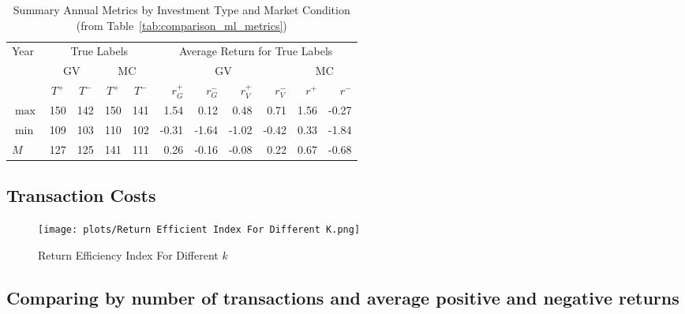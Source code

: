 \documentclass{article}
\begin{document}
\begin{table}[!ht]
    \centering
    \caption{Summary Annual Metrics by Investment Type and 
    Market Condition (from Table~\ref{tab:comparison_ml_metrics})}
    \begin{tabular}{l| cc | cc || rrrr|rr}
    \hline
    \multirow{3}{*}{Year} & \multicolumn{4}{c||}{True Labels}   & \multicolumn{6}{c}{Average Return for True Labels}  \\ \cline{2-11}
     & \multicolumn{2}{c|}{GV}  &  \multicolumn{2}{c||}{MC}  & \multicolumn{4}{c|}{GV}  &  \multicolumn{2}{c}{MC}  \\ \cline{2-11}
    & $T^{+}$ & $T^{-}$ & $T^{+}$ & $T^{-}$ & $r^{+}_{G}$ & $r^{-}_{G}$ & $r^{+}_{V}$ & $r^{-}_{V}$ & $r^{+}$ & $r^{-}$ \\ \cline{1-11}
         $\max$ & 150 & 142 & 150 & 141 & 1.54 & 0.12 & 0.48 & 0.71 & 1.56 & -0.27 \\ 
        $\min$ & 109 & 103 & 110 & 102 & -0.31 & -1.64 & -1.02 & -0.42 & 0.33 & -1.84 \\ 
        $M$ & 127 & 125 & 141 & 111 & 0.26 & -0.16 & -0.08 & 0.22 & 0.67 & -0.68 \\ 
        \hline
    \end{tabular}
    \label{tab:comparison_ml_metrics_summary}
\end{table}

\subsection{Transaction Costs}



\begin{figure}[htbp]
  \centering
  \texttt{[image: plots/Return Efficient Index For Different K.png]}
  \caption{Return Efficiency Index For Different $k$}
  \label{fig:Return Efficient Index For Different K}
\end{figure}

\subsection{Comparing by number of transactions and average positive and negative returns}
\end{document}
